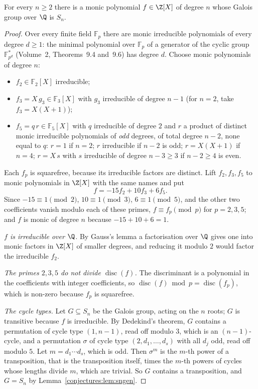 \begin{theorem}\label{conjectures:thm:sn}
For every $n\ge2$ there is a monic polynomial $f\in\Z[X]$ of degree $n$ whose Galois group over $\Q$ is $S_n$.
\end{theorem}
\begin{proof}
Over every finite field $\mathbb F_p$ there are monic irreducible polynomials of every degree $d\ge1$: the minimal polynomial over $\mathbb F_p$ of a generator
of the cyclic group $\mathbb F_{p^d}^*$ (Volume~2, Theorems~9.4 and~9.6) has degree $d$. Choose monic polynomials of degree $n$:
\begin{itemize}
\item $f_2\in\mathbb F_2[X]$ irreducible;
\item $f_3=X\,g_3\in\mathbb F_3[X]$ with $g_3$ irreducible of degree $n-1$ (for $n=2$, take $f_3=X(X+1)$);
\item $f_5=q\,r\in\mathbb F_5[X]$ with $q$ irreducible of degree $2$ and $r$ a product of distinct monic irreducible polynomials of \emph{odd} degrees, of
total degree $n-2$, none equal to $q$: $r=1$ if $n=2$; $r$ irreducible if $n-2$ is odd; $r=X(X+1)$ if $n=4$; $r=X\,s$ with $s$ irreducible of degree
$n-3\ge3$ if $n-2\ge4$ is even.
\end{itemize}
Each $f_p$ is squarefree, because its irreducible factors are distinct. Lift $f_2,f_3,f_5$ to monic polynomials in $\Z[X]$ with the same names and put
\[
f=-15f_2+10f_3+6f_5.
\]
Since $-15\equiv1\pmod2$, $10\equiv1\pmod3$, $6\equiv1\pmod5$, and the other two coefficients vanish modulo each of these primes, $f\equiv f_p\pmod p$ for
$p=2,3,5$; and $f$ is monic of degree $n$ because $-15+10+6=1$.

\emph{$f$ is irreducible over $\Q$.} By Gauss's lemma a factorisation over $\Q$ gives one into monic factors in $\Z[X]$ of smaller degrees, and reducing it
modulo $2$ would factor the irreducible $f_2$.

\emph{The primes $2,3,5$ do not divide $\operatorname{disc}(f)$.} The discriminant is a polynomial in the coefficients with integer coefficients, so
$\operatorname{disc}(f)\bmod p=\operatorname{disc}(f_p)$, which is non-zero because $f_p$ is squarefree.

\emph{The cycle types.} Let $G\subseteq S_n$ be the Galois group, acting on the $n$ roots; $G$ is transitive because $f$ is irreducible. By Dedekind's
theorem, $G$ contains a permutation of cycle type $(1,n-1)$, read off modulo $3$, which is an $(n-1)$-cycle, and a permutation $\sigma$ of cycle type
$(2,d_1,\dots,d_s)$ with all $d_j$ odd, read off modulo $5$. Let $m=d_1\cdots d_s$, which is odd. Then $\sigma^m$ is the $m$-th power of a
transposition, that is the transposition itself, times the $m$-th powers of cycles whose lengths divide $m$, which are trivial. So $G$ contains a
transposition, and $G=S_n$ by Lemma~\ref{conjectures:lem:sngen}.
\end{proof}

